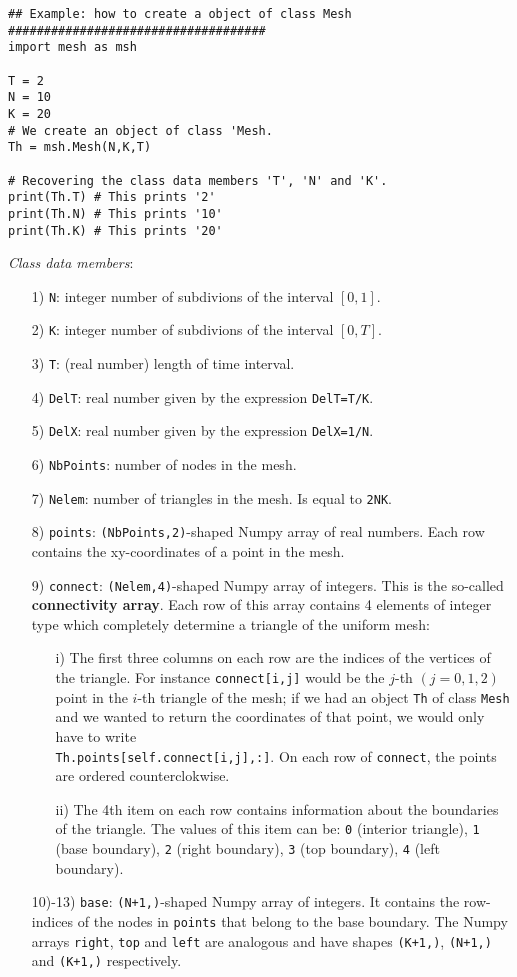 \documentclass{amsart}
\theoremstyle{plain}
\theoremstyle{definition}
\theoremstyle{remark}
\numberwithin{equation}{section}
\begin{document}
\begin{lstlisting} 
## Example: how to create a object of class Mesh
####################################
import mesh as msh

T = 2
N = 10
K = 20
# We create an object of class 'Mesh.
Th = msh.Mesh(N,K,T)

# Recovering the class data members 'T', 'N' and 'K'.
print(Th.T) # This prints '2'
print(Th.N) # This prints '10'
print(Th.K) # This prints '20'
\end{lstlisting}
\textit{Class data members}:
\begin{itemize}
\item[1)] \verb|N|: integer number of subdivions of the interval $[0,1]$.
\item[2)] \verb|K|: integer number of subdivions of the interval $[0,T]$.
\item[3)] \verb|T|: (real number) length of time interval.
\item[4)] \verb|DelT|: real number given by the expression \verb|DelT=T/K|.
\item[5)] \verb|DelX|: real number given by the expression \verb|DelX=1/N|.
\item[6)] \verb|NbPoints|: number of nodes in the mesh.
\item[7)]  \verb|Nelem|: number of triangles in the mesh. Is equal to \verb|2NK|.
\item[8)] \verb|points|: \verb|(NbPoints,2)|-shaped Numpy array of real numbers. Each row contains the
xy-coordinates of a point in the mesh.
\item[9)] \verb|connect|: \verb|(Nelem,4)|-shaped Numpy array of integers. This is the so-called {\bf connectivity array}. Each row of this array contains 4 elements of integer type which completely
determine a triangle of the uniform mesh:
	\begin{itemize}
	\item[i)] The first three columns on each row are the indices of the vertices of the
		triangle. For instance \verb|connect[i,j]| would be the $j$-th $(j=0,1,2)$ point in the
		$i$-th triangle of the mesh; if we had an object \verb|Th| of class \verb|Mesh| and we wanted to 			return the coordinates of that point, we would only have to write \verb|									Th.points[self.connect[i,j],:]|.
		On each row of \verb|connect|, the points are ordered counterclokwise.
	\item[ii)] The 4th item on each row contains information about the boundaries of
		the triangle. The values of this item can be: \verb|0| (interior triangle), \verb|1| (base 					boundary), \verb|2| (right boundary), \verb|3| (top boundary), \verb|4| (left boundary).
	\end{itemize}
\item[10)-13)] \verb|base|: \verb|(N+1,)|-shaped Numpy array of integers. It contains the row-indices of the nodes in \verb|points| that belong to the base boundary. The Numpy arrays \verb|right|, \verb|top| and \verb|left| are analogous and have shapes \verb|(K+1,)|, \verb|(N+1,)| and \verb|(K+1,)| respectively.
\end{itemize}
\end{document}
